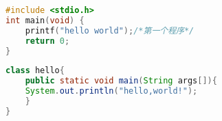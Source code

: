\begin{appendix}
\begin{lstlisting}[language=c]
#include <stdio.h>
int main(void) {
    printf("hello world");/*第一个程序*/
    return 0;
}
\end{lstlisting}
\begin{lstlisting}[language=java]
class hello{
	public static void main(String args[]){
	System.out.println("hello,world!");
	}
}
\end{lstlisting}
\end{appendix}
